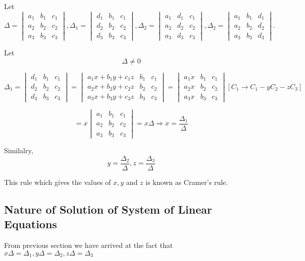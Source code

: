 Let $$\Delta = \begin{vmatrix}a_1&b_1&c_1\\a_2&b_2&c_2\\a_3&b_3&c_3\end{vmatrix},
\Delta_1 = \begin{vmatrix}d_1&b_1&c_1\\d_2&b_2&c_2\\d_3&b_3&c_3\end{vmatrix},
\Delta_2 = \begin{vmatrix}a_1&d_1&c_1\\a_2&d_2&c_2\\a_3&d_3&c_3\end{vmatrix},
\Delta_2 = \begin{vmatrix}a_1&b_1&d_1\\a_2&b_2&d_2\\a_3&b_3&d_3\end{vmatrix}.$$

Let $$\Delta \neq 0$$

$$\Delta_1 = \begin{vmatrix}d_1&b_1&c_1\\d_2&b_2&c_2\\d_3&b_3&c_3\end{vmatrix} = \begin{vmatrix}a_1x + b_1y + c_1z& b_1 & c_1\\a_2x
    + b_2y + c_2z & b_2 & c_2 \\a_3x + b_3y + c_3z & b_3 & c_3\end{vmatrix}
= \begin{vmatrix}a_1x & b_1 & c_1\\a_2x & b_2 & c_2 \\a_3x & b_3 &c_3\end{vmatrix}[C_1\rightarrow C_1 - yC_2 -zC_3]$$

$$= x\begin{vmatrix}a_1&b_1&c_1\\a_2&b_2&c_2\\a_3&b_3&c_3\end{vmatrix} = x\Delta
\Rightarrow x = \frac{\Delta_1}{\Delta}$$

Similalry, $$y = \frac{\Delta_2}{\Delta}, z = \frac{\Delta_3}{\Delta}$$

This rule which gives the values of $x, y$ and $z$ is known as Cramer's rule.

\subsection{Nature of Solution of System of Linear Equations}
From previous section we have arrived at the fact that $x\Delta = \Delta_1, y\Delta = \Delta_2, z\Delta = \Delta_3$

